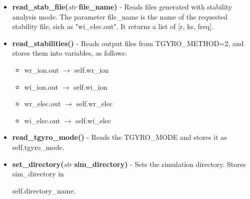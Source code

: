 \documentclass{article}
\begin{document}
\begin{itemize}
\begin{itemize}
\item \textbf{read\_stab\_file(}\emph{str}\textbf{ file\_name)} - Reads files generated with stability analysis mode.  The parameter file\_name is the name of the requested stability file, sich as "wi\_elec.out".  It returns a list of [r, ks, freq].
\item \textbf{read\_stabilities()} - Reads output files from TGYRO\_METHOD=2, and stores them into variables, as follows:
\begin{itemize}
\item wr\_ion.out $\rightarrow$ self.wr\_ion
\item wi\_ion.out $\rightarrow$ self.wi\_ion
\item wr\_elec.out $\rightarrow$ self.wr\_elec
\item wi\_elec.out $\rightarrow$ self.wi\_elec
\end{itemize}
\item \textbf{read\_tgyro\_mode()} - Reads the TGYRO\_MODE and stores it as self.tgyro\_mode.
\item \textbf{set\_directory(}\emph{str}\textbf{ sim\_directory)} - Sets the simulation directory.  Stores sim\_directory in

self.directory\_name.
\end{itemize}
\end{itemize}
\end{document}
